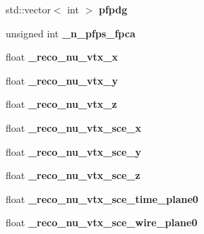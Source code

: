 \begin{DoxyCompactItemize}
\item 
std\+::vector$<$ int $>$ {\bfseries pfpdg}\hypertarget{classanalysis_1_1MCS_ad57ff680a8ce33439e9ec99538436936}{}\label{classanalysis_1_1MCS_ad57ff680a8ce33439e9ec99538436936}

\item 
unsigned int {\bfseries \+\_\+n\+\_\+pfps\+\_\+fpca}\hypertarget{classanalysis_1_1MCS_ae3c0506fb77d66e7bf8e505eb72e3da0}{}\label{classanalysis_1_1MCS_ae3c0506fb77d66e7bf8e505eb72e3da0}

\item 
float {\bfseries \+\_\+reco\+\_\+nu\+\_\+vtx\+\_\+x}\hypertarget{classanalysis_1_1MCS_a0b4c6bdb5f7b669843e35ba12d978c3a}{}\label{classanalysis_1_1MCS_a0b4c6bdb5f7b669843e35ba12d978c3a}

\item 
float {\bfseries \+\_\+reco\+\_\+nu\+\_\+vtx\+\_\+y}\hypertarget{classanalysis_1_1MCS_ab9072c61ce01d20b0e216a9d3f9fd257}{}\label{classanalysis_1_1MCS_ab9072c61ce01d20b0e216a9d3f9fd257}

\item 
float {\bfseries \+\_\+reco\+\_\+nu\+\_\+vtx\+\_\+z}\hypertarget{classanalysis_1_1MCS_adcc7b0a44caee3977fa1d08242292c2f}{}\label{classanalysis_1_1MCS_adcc7b0a44caee3977fa1d08242292c2f}

\item 
float {\bfseries \+\_\+reco\+\_\+nu\+\_\+vtx\+\_\+sce\+\_\+x}\hypertarget{classanalysis_1_1MCS_aa56f1e960398b7d9be14b58470edc43d}{}\label{classanalysis_1_1MCS_aa56f1e960398b7d9be14b58470edc43d}

\item 
float {\bfseries \+\_\+reco\+\_\+nu\+\_\+vtx\+\_\+sce\+\_\+y}\hypertarget{classanalysis_1_1MCS_a62a21fcabf3813fbe506ee6a748ced8a}{}\label{classanalysis_1_1MCS_a62a21fcabf3813fbe506ee6a748ced8a}

\item 
float {\bfseries \+\_\+reco\+\_\+nu\+\_\+vtx\+\_\+sce\+\_\+z}\hypertarget{classanalysis_1_1MCS_ae6d269e281721a314efa8ebfaa44f247}{}\label{classanalysis_1_1MCS_ae6d269e281721a314efa8ebfaa44f247}

\item 
float {\bfseries \+\_\+reco\+\_\+nu\+\_\+vtx\+\_\+sce\+\_\+time\+\_\+plane0}\hypertarget{classanalysis_1_1MCS_a6a441797448a8000d255caa0299c3112}{}\label{classanalysis_1_1MCS_a6a441797448a8000d255caa0299c3112}

\item 
float {\bfseries \+\_\+reco\+\_\+nu\+\_\+vtx\+\_\+sce\+\_\+wire\+\_\+plane0}\hypertarget{classanalysis_1_1MCS_a7938bfb6fdfb7c4ad17ffcfd1636bef8}{}\label{classanalysis_1_1MCS_a7938bfb6fdfb7c4ad17ffcfd1636bef8}


\end{DoxyCompactItemize}
